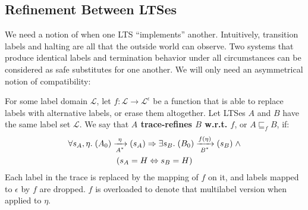 
\subsection{Refinement Between LTSes}

We need a notion of when one LTS ``implements'' another.  Intuitively,
transition labels and halting are all that the outside world
can observe. Two systems that produce identical labels and termination behavior
under all circumstances can be considered as safe substitutes for
one another. We will only need an asymmetrical notion of compatibility:

\begin{defn}\label{refines}
For some label domain $\mathcal L$, let $f : \mathcal L \to \mathcal L^\epsilon$ 
be a function that is able to replace labels with alternative
labels, or erase them altogether. Let LTSes $A$ and $B$ have the same label
set $\mathcal L$. We say that
\textbf{$A$ trace-refines $B$ w.r.t. $f$}, or $A \sqsubseteq_f B$, if:
\begin{multline*}
\forall s_A, \eta. \; \io{$A^{*}$}{A_0}{s_A}{\eta} \Rightarrow \exists s_B. \;
\io{$B^{*}$}{B_0}{s_B}{f(\eta)} \; \wedge \\
(s_A = H \Leftrightarrow s_B = H)
\end{multline*}
Each label in the trace is replaced by the mapping of $f$ on it, and
labels mapped to $\epsilon$ by $f$ are dropped. $f$ is overloaded
to denote that multilabel version when applied to $\eta$.
\end{defn}

